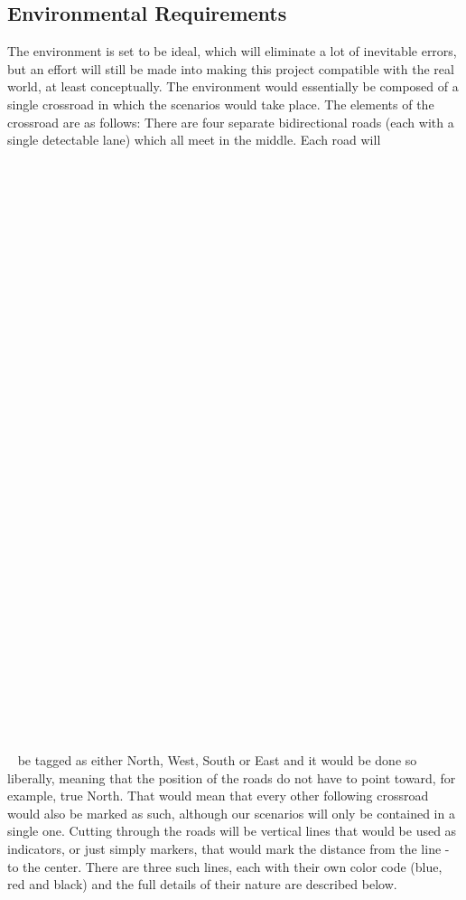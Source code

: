 \documentclass[conference]{IEEEtran}
\begin{document}
\subsection {Environmental Requirements}
The environment is set to be ideal, which will eliminate a lot of inevitable errors, but an effort will still be made into making this project compatible with the real world, at least conceptually. The environment would essentially be composed of a single crossroad in which the scenarios would take place. The elements of the crossroad are as follows: There are four separate bidirectional roads (each with a single detectable lane) which all meet in the middle. Each road will \\  \\  \\  \\  \\  \\  \\  \\  \\  \\  \\  \\ \\  \\  \\  \\  \\  \\  \\  \\  \\  \\  \\  \\  \\  \\  \\  \\  \\  \\  \\  \\  \\  \\  \\  be tagged as  either North, West, South or East and it would be done so liberally, meaning that the position of the roads do not have to point toward, for example, true North. That would mean that every other following crossroad would also be marked as such, although our scenarios will only be contained in a single one. Cutting through the roads will be vertical lines that would be used as indicators, or just simply markers, that would mark the distance from the line - to the center. There are three such lines, each with their own color code (blue, red and black) and the full details of their nature are described below. 
\end{document}

